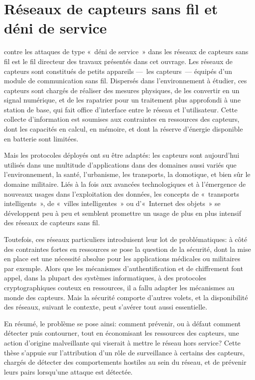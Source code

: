 \section{Réseaux de capteurs sans fil et déni de service}

 contre les attaques de type « déni de service » dans les réseaux de capteurs sans fil est le fil directeur des travaux présentés dans cet ouvrage.\linebreak
Les réseaux de capteurs sont constitués de petits appareils ---~les capteurs~--- équipés d'un module de communication sans fil.
Dispersés dans l'environnement à étudier, ces capteurs sont chargés de réaliser des mesures physiques, de les convertir en un signal numérique, et de les rapatrier pour un traitement plus approfondi à une station de base, qui fait office d'interface entre le réseau et l'utilisateur.
Cette collecte d'information est soumises aux contraintes en ressources des capteurs, dont les capacités en calcul, en mémoire, et dont la réserve d'énergie disponible en batterie sont limitées.

Mais les protocoles déployés ont su être adaptés: les capteurs sont aujourd'hui utilisés dans une multitude d'applications dans des domaines aussi variés que l'environnement, la santé, l'urbanisme, les transports, la domotique, et bien sûr le domaine militaire.
Liés à la fois aux avancées technologiques et à l'émergence de nouveaux usages dans l'exploitation des données, les concepts de « transports intelligents », de « villes intelligentes » ou d'« Internet des objets » se développent peu à peu et semblent promettre un usage de plus en plus intensif des réseaux de capteurs sans fil.

Toutefois, ces réseaux particuliers introduisent leur lot de problématiques: à côté des contraintes fortes en ressources se pose la question de la sécurité, dont la mise en place est une nécessité absolue pour les applications médicales ou militaires par exemple.
Alors que les mécanismes d'authentification et de chiffrement font appel, dans la plupart des systèmes informatiques, à des protocoles cryptographiques couteux en ressources, il a fallu adapter les mécanismes au monde des capteurs.
Mais la sécurité comporte d'autres volets, et la disponibilité des réseaux, suivant le contexte, peut s'avérer tout aussi essentielle.

En résumé, le problème se pose ainsi: comment prévenir, ou à défaut comment détecter puis contourner, tout en économisant les ressources des capteurs, une action d'origine malveillante qui viserait à mettre le réseau hors service?
Cette thèse s'appuie sur l'attribution d'un rôle de surveillance à certains des capteurs, chargés de détecter des comportements hostiles au sein du réseau, et de prévenir leurs pairs lorsqu'une attaque est détectée.

